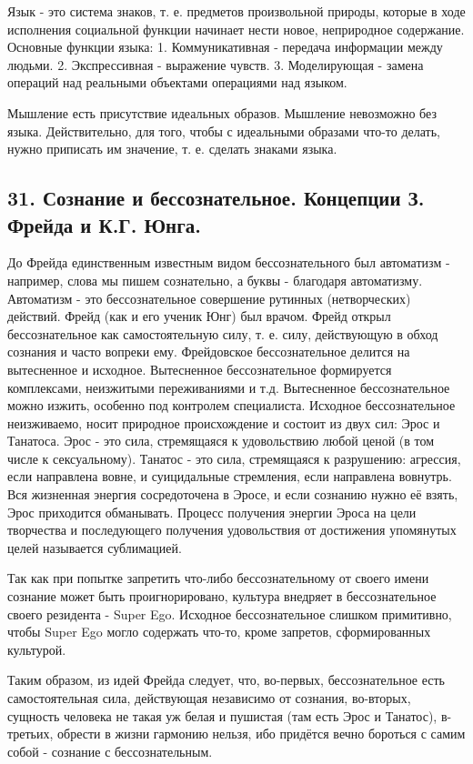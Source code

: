 \documentclass[a4paper, 12pt]{article}
\begin{document}
Язык - это система знаков, т. е. предметов произвольной природы, которые в ходе исполнения социальной функции начинает нести новое, неприродное содержание.
Основные функции языка:
1. Коммуникативная - передача информации между людьми.
2. Экспрессивная - выражение чувств.
3. Моделирующая - замена операций над реальными объектами операциями над языком.

Мышление есть присутствие идеальных образов.
Мышление невозможно без языка.
Действительно, для того, чтобы с идеальными образами что-то делать, нужно приписать им значение, т. е. сделать знаками языка.


\subsection*{\textbf{31. Сознание и бессознательное. Концепции З. Фрейда и  К.Г. Юнга.}}

До Фрейда единственным известным видом бессознательного был автоматизм - например, слова мы пишем сознательно, а буквы - благодаря автоматизму.
Автоматизм - это бессознательное совершение рутинных (нетворческих) действий.
Фрейд (как и его ученик Юнг) был врачом.
Фрейд открыл бессознательное как самостоятельную силу, т. е. силу, действующую в обход сознания и часто вопреки ему.
Фрейдовское бессознательное делится на вытесненное и исходное.
Вытесненное бессознательное формируется комплексами, неизжитыми переживаниями и т.д.
Вытесненное бессознательное можно изжить, особенно под контролем специалиста.
Исходное бессознательное неизживаемо, носит природное происхождение и состоит из двух сил: Эрос и Танатоса.
Эрос - это сила, стремящаяся к удовольствию любой ценой (в том числе к сексуальному).
Танатос - это сила, стремящаяся к разрушению: агрессия, если направлена вовне, и суицидальные стремления, если направлена вовнутрь.
Вся жизненная энергия сосредоточена в Эросе, и если сознанию нужно её взять, Эрос приходится обманывать.
Процесс получения энергии Эроса на цели творчества и последующего получения удовольствия от достижения упомянутых целей называется сублимацией.

Так как при попытке запретить что-либо бессознательному от своего имени сознание может быть проигнорировано, культура внедряет в бессознательное своего резидента - Super Ego.
Исходное бессознательное слишком примитивно, чтобы Super Ego могло содержать что-то, кроме запретов, сформированных культурой.

Таким образом, из идей Фрейда следует, что, во-первых, бессознательное есть самостоятельная сила, действующая независимо от сознания, во-вторых, сущность человека не такая уж белая и пушистая (там есть Эрос и Танатос), в-третьих, обрести в жизни гармонию нельзя, ибо придётся вечно бороться с самим собой - сознание с бессознательным.
\end{document}
